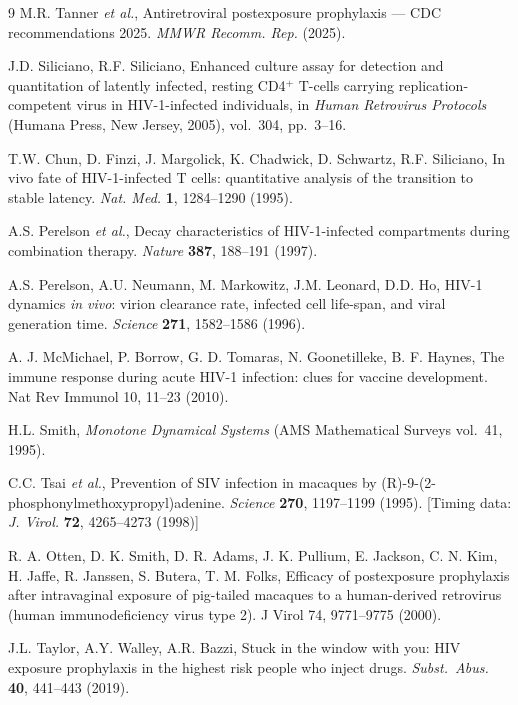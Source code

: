 \documentclass[11pt]{article}
\theoremstyle{definition}
\theoremstyle{remark}
\begin{document}
\begin{thebibliography}{9}
M.R. Tanner \textit{et al.}, Antiretroviral postexposure prophylaxis --- CDC recommendations 2025. \textit{MMWR Recomm. Rep.} (2025).

J.D. Siliciano, R.F. Siliciano, Enhanced culture assay for detection and quantitation of latently infected, resting CD4$^{+}$ T-cells carrying replication-competent virus in HIV-1-infected individuals, in \textit{Human Retrovirus Protocols} (Humana Press, New Jersey, 2005), vol.~304, pp.~3--16.

T.W. Chun, D. Finzi, J. Margolick, K. Chadwick, D. Schwartz, R.F. Siliciano, In vivo fate of HIV-1-infected T cells: quantitative analysis of the transition to stable latency. \textit{Nat. Med.} \textbf{1}, 1284--1290 (1995).

A.S. Perelson \textit{et al.}, Decay characteristics of HIV-1-infected compartments during combination therapy. \textit{Nature} \textbf{387}, 188--191 (1997).

A.S. Perelson, A.U. Neumann, M. Markowitz, J.M. Leonard, D.D. Ho, HIV-1 dynamics \textit{in vivo}: virion clearance rate, infected cell life-span, and viral generation time. \textit{Science} \textbf{271}, 1582--1586 (1996).

A. J. McMichael, P. Borrow, G. D. Tomaras, N. Goonetilleke, B. F. Haynes, The immune response during acute HIV-1 infection: clues for vaccine development. Nat Rev Immunol 10, 11–23 (2010).

H.L. Smith, \textit{Monotone Dynamical Systems} (AMS Mathematical Surveys vol.~41, 1995).

C.C. Tsai \textit{et al.}, Prevention of SIV infection in macaques by (R)-9-(2-phosphonylmethoxypropyl)adenine. \textit{Science} \textbf{270}, 1197--1199 (1995). [Timing data: \textit{J. Virol.} \textbf{72}, 4265--4273 (1998)]

R. A. Otten, D. K. Smith, D. R. Adams, J. K. Pullium, E. Jackson, C. N. Kim, H. Jaffe, R. Janssen, S. Butera, T. M. Folks, Efficacy of postexposure prophylaxis after intravaginal exposure of pig-tailed macaques to a human-derived retrovirus (human immunodeficiency virus type 2). J Virol 74, 9771–9775 (2000).

J.L. Taylor, A.Y. Walley, A.R. Bazzi, Stuck in the window with you: HIV exposure prophylaxis in the highest risk people who inject drugs. \textit{Subst.\ Abus.} \textbf{40}, 441--443 (2019).


\end{thebibliography}
\end{document}
